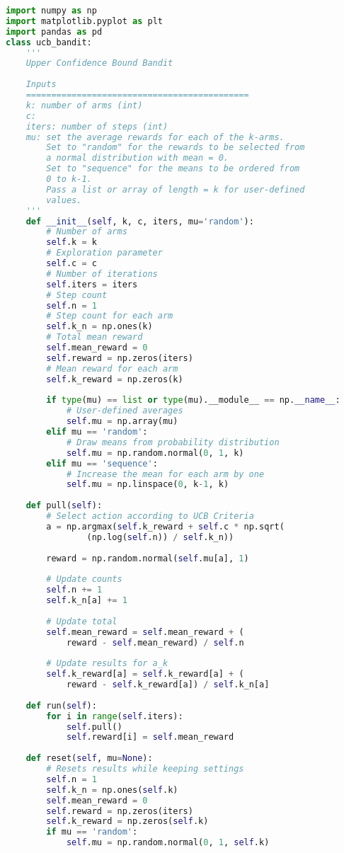 	\begin{lstlisting}[language=Python]
import numpy as np 
import matplotlib.pyplot as plt 
import pandas as pd
class ucb_bandit:
    '''
    Upper Confidence Bound Bandit
    
    Inputs 
    ============================================
    k: number of arms (int)
    c:
    iters: number of steps (int)
    mu: set the average rewards for each of the k-arms.
        Set to "random" for the rewards to be selected from
        a normal distribution with mean = 0. 
        Set to "sequence" for the means to be ordered from 
        0 to k-1.
        Pass a list or array of length = k for user-defined
        values.
    '''
    def __init__(self, k, c, iters, mu='random'):
        # Number of arms
        self.k = k
        # Exploration parameter
        self.c = c
        # Number of iterations
        self.iters = iters
        # Step count
        self.n = 1
        # Step count for each arm
        self.k_n = np.ones(k)
        # Total mean reward
        self.mean_reward = 0
        self.reward = np.zeros(iters)
        # Mean reward for each arm
        self.k_reward = np.zeros(k)
        
        if type(mu) == list or type(mu).__module__ == np.__name__:
            # User-defined averages            
            self.mu = np.array(mu)
        elif mu == 'random':
            # Draw means from probability distribution
            self.mu = np.random.normal(0, 1, k)
        elif mu == 'sequence':
            # Increase the mean for each arm by one
            self.mu = np.linspace(0, k-1, k)
        
    def pull(self):
        # Select action according to UCB Criteria
        a = np.argmax(self.k_reward + self.c * np.sqrt(
                (np.log(self.n)) / self.k_n))
            
        reward = np.random.normal(self.mu[a], 1)
        
        # Update counts
        self.n += 1
        self.k_n[a] += 1
        
        # Update total
        self.mean_reward = self.mean_reward + (
            reward - self.mean_reward) / self.n
        
        # Update results for a_k
        self.k_reward[a] = self.k_reward[a] + (
            reward - self.k_reward[a]) / self.k_n[a]
        
    def run(self):
        for i in range(self.iters):
            self.pull()
            self.reward[i] = self.mean_reward
            
    def reset(self, mu=None):
        # Resets results while keeping settings
        self.n = 1
        self.k_n = np.ones(self.k)
        self.mean_reward = 0
        self.reward = np.zeros(iters)
        self.k_reward = np.zeros(self.k)
        if mu == 'random':
            self.mu = np.random.normal(0, 1, self.k)
	
	\end{lstlisting}

